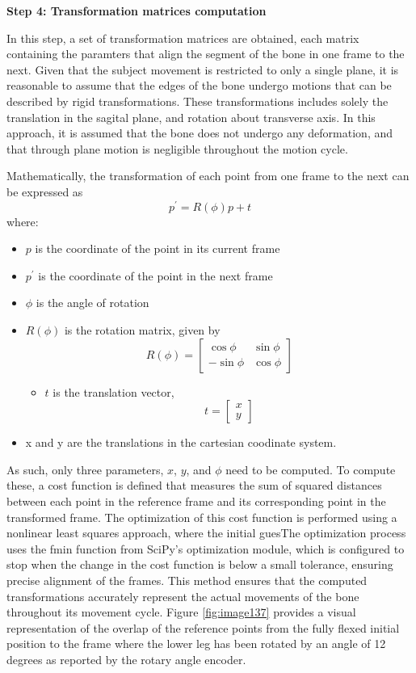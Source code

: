 \documentclass{micro-econ-thesis}
\begin{document}
\textbf{Step 4: Transformation matrices computation}

In this step, a set of transformation matrices are obtained, each matrix containing the paramters that align the segment of the bone in one frame to the next. Given that the subject movement is restricted to only a single plane, it is reasonable to assume that the edges of the bone undergo motions that can be described by rigid transformations. These transformations includes solely the translation in the sagital plane, and rotation about transverse axis. In this approach, it is assumed that the bone does not undergo any deformation, and that through plane motion is negligible throughout the motion cycle. 

Mathematically, the transformation of each point from one frame to the next can be expressed as 
\begin{equation}
	p^{'} = R(\phi)p + t 
\end{equation}
where: 
\begin{itemize}
	\item \textbf{$p$} is the coordinate of the point in its current frame
	\item \textbf{$p^{'}$} is the coordinate of the point in the next frame
	\item $\phi$ is the angle of rotation
	\item \textbf{$R(\phi)$}  is the rotation matrix, given by 
	 \[
	 R(\phi) = 
	 \begin{bmatrix}
	 	\cos \phi & \sin \phi \\
	 	-\sin \phi & \cos \phi
	 \end{bmatrix}
	 \]
	 \begin{itemize}
	 	\item $t$ is the translation vector,
	 	\[
	 	t = \begin{bmatrix}
	 		x \\
	 		y
	 	\end{bmatrix}
	 	\]
	 \end{itemize}
 	\item x and y are the translations in the cartesian coodinate system. 
\end{itemize}   
As such, only three parameters, $x$, $y$, and $\phi$ need to be computed. To compute these, a cost function is defined that measures the sum of squared distances between each point in the reference frame and its corresponding point in the transformed frame. The optimization of this cost function is performed using a nonlinear least squares approach, where the initial guesThe optimization process uses the fmin function from SciPy’s optimization module, which is configured to stop when the change in the cost function is below a small tolerance, ensuring precise alignment of the frames. This method ensures that the computed transformations accurately represent the actual movements of the bone throughout its movement cycle. Figure \ref{fig:image137} provides a visual representation of the overlap of the reference points from the fully flexed initial position to the frame where the lower leg has been rotated by an angle of 12 degrees as reported by the rotary angle encoder. 
\end{document}
